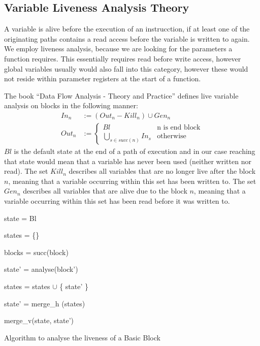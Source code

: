 \subsection{Variable Liveness Analysis Theory}
\label{subsection:livenessanalysis}
A variable is alive before the execution of an instrucction, if at least one of the originating paths contains a read access before the variable is written to again. We employ liveness analysis, because we are looking for the  parameters a function requires. This essentially requires read before write access, however global variables usually would also fall into this category, however these would not reside within parameter registers at the start of a function.

The book ``Data Flow Analysis - Theory and Practice'' \cite{khedker2009data} defines live variable analysis on blocks in the following manner:
\begin{subequations}
\label{eq:livenessbasedef}
\begin{align}
In_n &:= (Out_n - Kill_n) \cup Gen_n \label{eq:livenessbasedefIn} \\
Out_n &:= \left\{
  \begin{array}{lr}
    Bl & \text{n is end block}\\
    \underset{s \in succ(n)}{\bigcup} In_s & \text{otherwise}
  \end{array}
\right. \label{eq:livenessbasedefOut}
\end{align}
\end{subequations}
$Bl$ is the default state at the end of a path of execution and in our case reaching that state would mean that a variable has never been used (neither written nor read). The set $Kill_n$ describes all variables that are no longer live after the block $n$, meaning that a variable occurring within this set has been written to. The set $Gen_n$ describes all variables that are alive due to the block $n$, meaning that a variable occurring within this set has been read before it was written to.

\begin{algorithm}[!h]
	\SetAlgoLined
	{
 	state = Bl
 	

	states = \{\}
	
	blocks = succ(block)
	
	 {
	
 		state' = analyse(block')
 		
		states = states $\cup$ \{ state' \}
	}

	state' = merge\_h (states)

	\Return merge\_v(state, state')

	}
\caption{Algorithm to analyse the liveness of a Basic Block}
\label{alg:liveness}
\end{algorithm}

